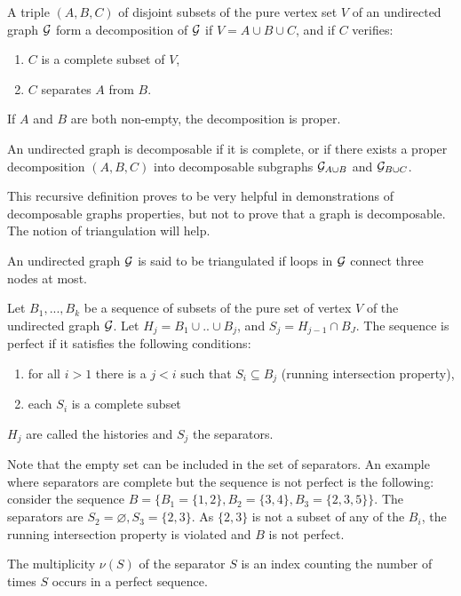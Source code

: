  \begin{definition}
 A triple $(A, B, C)$ of disjoint subsets of the pure vertex set $V$ of an undirected graph $\mathcal{G}$ form a decomposition of $\mathcal{G}$ if $V=A\cup B \cup C$, and if $C$ verifies:
 \begin{enumerate}[label=(\roman*)]
 \item $C$ is a complete subset of  $V$,
 \item $C$ separates $A$ from $B$.
 \end{enumerate}
 If $A$ and $B$ are both non-empty, the decomposition is proper.
 \end{definition}
 
 
 \begin{definition}
 An undirected graph is decomposable if it is complete, or if there exists a proper decomposition $(A, B, C)$ into decomposable subgraphs $\mathcal{G}_{A\cup B}$ and $\mathcal{G}_{B\cup C}$.
 \end{definition}
 This recursive definition proves to be very helpful in demonstrations of decomposable graphs properties, but not to prove that a graph is decomposable. The notion of triangulation will help.
 
 \begin{definition}
 An undirected graph $\mathcal{G}$ is said to be triangulated if loops in $\mathcal{G}$ connect three nodes at most.
 \end{definition} 
 \begin{definition}
 Let $B_1,...,B_k$ be a sequence of subsets of the pure set of vertex $V$ of the undirected graph $\mathcal{G}$. Let $H_j=B_1\cup .. \cup B_j$, and $S_j = H_{j-1} \cap B_J$. The sequence is perfect if it satisfies the following conditions:
 \begin{enumerate}[label=(\roman*)]
 \item for all $i>1$ there is a $j<i$ such that $S_i \subseteq B_j$ (running intersection property),
 \item each $S_i$ is a complete subset
 \end{enumerate}
 $H_j$ are called the histories and $S_j$ the separators.
 \end{definition}
Note that the empty set can be included in the set of separators. An example where separators are complete but the sequence is not perfect is the following: consider the sequence $B=\big\{B_1=\{1,2\}, B_2=\{3,4\},B_3=\{2,3,5\}\big\}$. The separators are $S_2=\varnothing, S_3=\{2,3\}$. As $\{2,3\}$ is not a subset of any of the $B_i$, the running intersection property is violated and $B$ is not perfect.
 \begin{definition}
 The multiplicity $\nu (S)$ of the separator $S$ is an index counting the number of times $S$ occurs in a perfect sequence.
 \end{definition}
 
